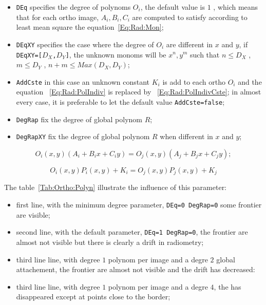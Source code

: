 \begin{itemize}
  \item {\tt DEq} specifies the degree of polynoms $O_i$, the default value is
        $1$ , which means that for each ortho image, $A_i,B_i,C_i$ are computed
        to satisfy according to least mean square the equation~\ref{Eq:Rad:Mon};

   \item {\tt DEqXY} specifies the case where the degree of $O_i$ are different in
         $x$ and $y$, if  {\tt DEqXY=[$D_X$,$D_Y$]}, the unknown monoms will
         be $x^n,y^m$ such that $n\leq D_X$ , $m\leq D_Y$ ,   $n+m\leq Max(D_X,D_Y)$;

   \item {\tt AddCste} in this case an unknown constant $K_i$ is add to each ortho $O_i$ and
          the equation ~\ref{Eq:Rad:PolIndiv} is replaced by ~\ref{Eq:Rad:PolIndivCste};
          in almost every case, it is preferable to let the default value {\tt AddCste=false};

   \item {\tt DegRap} fix the degree of global polynom $R$;

   \item {\tt DegRapXY} fix the degree of global polynom $R$ when different in $x$ and $y$;
    
\end{itemize}



\begin{equation}
O_i(x,y)(A_i+B_ix+C_iy)=O_j(x,y)(A_j+B_jx+C_jy);
\label{Eq:Rad:Mon}
\end{equation}

\begin{equation}
   O_i(x,y) P_i(x,y) + K_i = O_j(x,y) P_j(x,y) + K_j
\label{Eq:Rad:PolIndivCste}
\end{equation}

The table~\ref{Tab:Ortho:Polyn} illustrate the influence of this parameter:

\begin{itemize}
   \item first line, with the minimum degree parameter, {\tt DEq=0 DegRap=0} some
         frontier are visible;
   \item second line, with the default parameter, {\tt DEq=1 DegRap=0}, the frontier
         are almost not visible but there is clearly a drift in radiometry;
   \item third line line, with  degree $1$ polynom per image and a degre $2$ global
         attachement, the frontier are almost not visible and the drift has decreased:
   \item third line line, with  degree $1$ polynom per image and a degre $4$, the
         has disappeared except at points close to the border;
\end{itemize}

